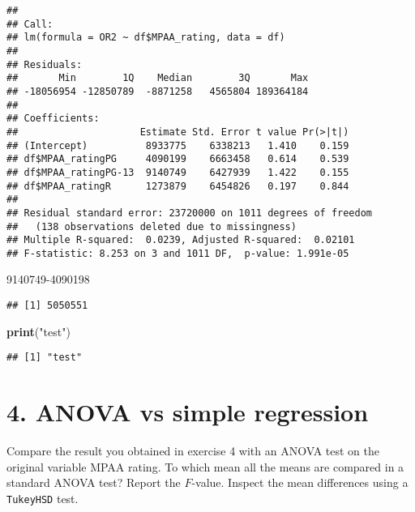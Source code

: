 \documentclass[
]{article}
\newenvironment{Shaded}{\begin{snugshade}}{\end{snugshade}}
\newcommand{\CommentTok}[1]{\textcolor[rgb]{0.56,0.35,0.01}{\textit{#1}}}
\newcommand{\DecValTok}[1]{\textcolor[rgb]{0.00,0.00,0.81}{#1}}
\newcommand{\KeywordTok}[1]{\textcolor[rgb]{0.13,0.29,0.53}{\textbf{#1}}}
\newcommand{\NormalTok}[1]{#1}
\newcommand{\OperatorTok}[1]{\textcolor[rgb]{0.81,0.36,0.00}{\textbf{#1}}}
\newcommand{\StringTok}[1]{\textcolor[rgb]{0.31,0.60,0.02}{#1}}
\begin{document}
\begin{verbatim}
## 
## Call:
## lm(formula = OR2 ~ df$MPAA_rating, data = df)
## 
## Residuals:
##       Min        1Q    Median        3Q       Max 
## -18056954 -12850789  -8871258   4565804 189364184 
## 
## Coefficients:
##                     Estimate Std. Error t value Pr(>|t|)
## (Intercept)          8933775    6338213   1.410    0.159
## df$MPAA_ratingPG     4090199    6663458   0.614    0.539
## df$MPAA_ratingPG-13  9140749    6427939   1.422    0.155
## df$MPAA_ratingR      1273879    6454826   0.197    0.844
## 
## Residual standard error: 23720000 on 1011 degrees of freedom
##   (138 observations deleted due to missingness)
## Multiple R-squared:  0.0239, Adjusted R-squared:  0.02101 
## F-statistic: 8.253 on 3 and 1011 DF,  p-value: 1.991e-05
\end{verbatim}

\begin{Shaded}
\begin{Highlighting}[]
\DecValTok{9140749-4090198} 
\end{Highlighting}
\end{Shaded}

\begin{verbatim}
## [1] 5050551
\end{verbatim}

\begin{Shaded}
\begin{Highlighting}[]
\KeywordTok{print}\NormalTok{(}\StringTok{"test"}\NormalTok{)}
\end{Highlighting}
\end{Shaded}

\begin{verbatim}
## [1] "test"
\end{verbatim}

\hypertarget{anova-vs-simple-regression}{%
\section{4. ANOVA vs simple
regression}\label{anova-vs-simple-regression}}

Compare the result you obtained in exercise 4 with an ANOVA test on the
original variable MPAA rating. To which mean all the means are compared
in a standard ANOVA test? Report the \(F\)-value. Inspect the mean
differences using a \texttt{TukeyHSD} test.

\begin{Shaded}
\end{Shaded}
\end{document}
